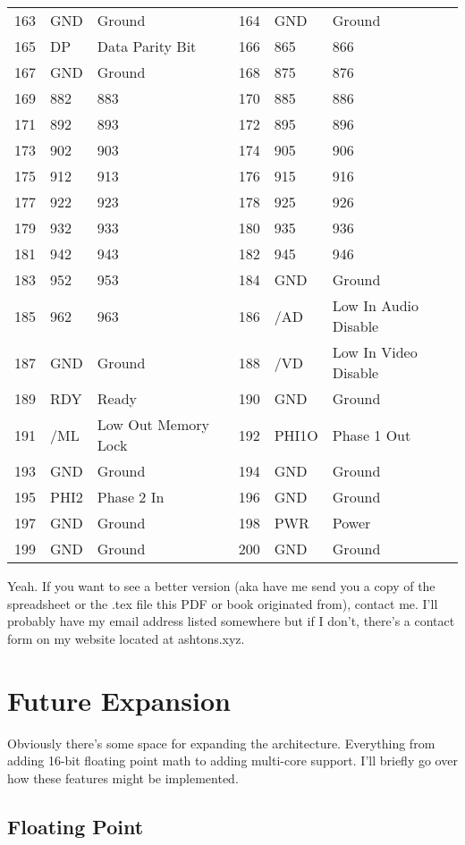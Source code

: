 \documentclass[letterpaper,12pt]{book}
\begin{document}
\begin{tabular}{|l|l|l|l|l|l|}
	163 & GND & Ground & 164 & GND & Ground\\
	165 & DP & Data Parity Bit & 166 & 865 & 866\\
	167 & GND & Ground & 168 & 875 & 876\\
	169 & 882 & 883 & 170 & 885 & 886\\
	171 & 892 & 893 & 172 & 895 & 896\\
	173 & 902 & 903 & 174 & 905 & 906\\
	175 & 912 & 913 & 176 & 915 & 916\\
	177 & 922 & 923 & 178 & 925 & 926\\
	179 & 932 & 933 & 180 & 935 & 936\\
	181 & 942 & 943 & 182 & 945 & 946\\
	183 & 952 & 953 & 184 & GND & Ground\\
	185 & 962 & 963 & 186 & /AD & Low In Audio Disable\\
	187 & GND & Ground & 188 & /VD & Low In Video Disable\\
	189 & RDY & Ready & 190 & GND & Ground\\
	191 & /ML & Low Out Memory Lock & 192 & PHI1O & Phase 1 Out\\
	193 & GND & Ground & 194 & GND & Ground\\
	195 & PHI2 & Phase 2 In & 196 & GND & Ground\\
	197 & GND & Ground & 198 & PWR & Power\\
	199 & GND & Ground & 200 & GND & Ground\\
\hline
\end{tabular}

Yeah. If you want to see a better version (aka have me send you a copy of the spreadsheet or the .tex file this PDF or book originated from), contact me. I'll probably have my email address listed somewhere but if I don't, there's a contact form on my website located at ashtons.xyz.

\chapter{Future Expansion}

Obviously there's some space for expanding the architecture. Everything from adding 16-bit floating point math to adding multi-core support. I'll briefly go over how these features might be implemented.

\section{Floating Point}
\end{document}
